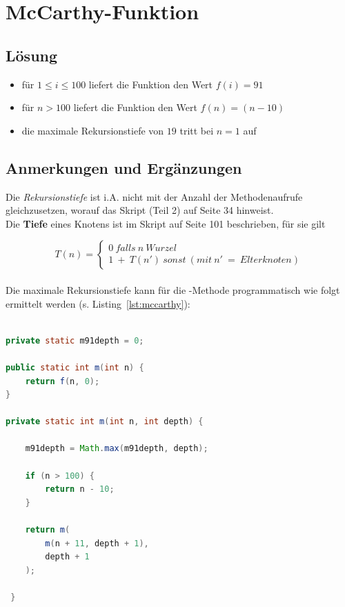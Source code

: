 \chapter{McCarthy-Funktion}

\section*{Lösung}

\begin{itemize}
    \item für $1 \leq i \leq 100$ liefert die Funktion den Wert $f(i) = 91$
    \item für $n > 100$ liefert die Funktion den Wert $f(n) = (n - 10)$
    \item die maximale Rekursionstiefe von $19$ tritt bei $n = 1$ auf
\end{itemize}


\section*{Anmerkungen und Ergänzungen}

Die \textit{Rekursionstiefe} ist i.A. nicht mit der Anzahl der Methodenaufrufe gleichzusetzen, worauf das Skript (Teil 2) auf Seite 34 hinweist.
\\

Die \textbf{Tiefe} eines Knotens ist im Skript auf Seite 101 beschrieben, für sie gilt

\begin{equation}
    T(n) = \begin{cases}
               0\ falls\ n\ Wurzel \\
               1\ +\ T(n')\ sonst\ (mit\ n'\ =\ Elterknoten)
    \end{cases}
\end{equation}\\

Die maximale Rekursionstiefe kann für die -Methode programmatisch wie folgt ermittelt werden (s. Listing~\ref{lst:mccarthy}):

\begin{lstlisting}[language=java,caption={Ermittlung der Rekursiontiefe für die McCarthy 91-Funktion. Die Rekursionstiefe wird in einer statischen Variable gespeichert.},label=lst:mccarthy]

private static m91depth = 0;

public static int m(int n) {
    return f(n, 0);
}

private static int m(int n, int depth) {

    m91depth = Math.max(m91depth, depth);

    if (n > 100) {
        return n - 10;
    }

    return m(
        m(n + 11, depth + 1),
        depth + 1
    );

 }

\end{lstlisting}

